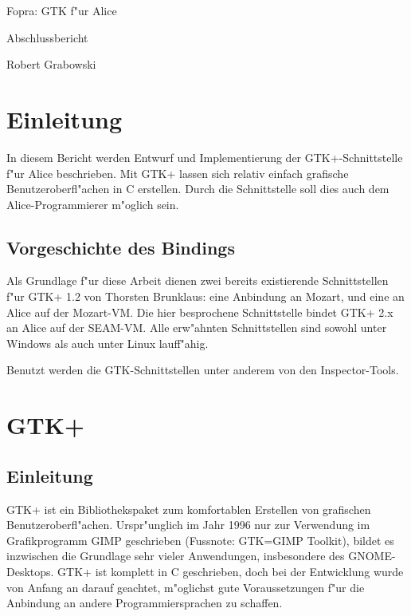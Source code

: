 \documentclass{article}
\begin{document}
\begin{center}
\begin{huge}Fopra: GTK f"ur Alice\end{huge}

Abschlussbericht

Robert Grabowski

\end{center}

\section{Einleitung}

In diesem Bericht werden Entwurf und Implementierung der 
GTK+-Schnittstelle f"ur Alice beschrieben. Mit GTK+ lassen sich relativ einfach
grafische Benutzeroberfl"achen in C erstellen. Durch die Schnittstelle soll
dies auch dem Alice-Programmierer m"oglich sein.

\subsection{Vorgeschichte des Bindings}

Als Grundlage f"ur diese Arbeit dienen zwei bereits existierende
Schnittstellen f"ur GTK+ 1.2 von Thorsten Brunklaus:
eine Anbindung an Mozart, und eine an Alice auf der Mozart-VM.
Die hier besprochene Schnittstelle bindet GTK+ 2.x an Alice auf der SEAM-VM.
Alle erw"ahnten Schnittstellen sind sowohl unter Windows als auch unter
Linux lauff"ahig.

Benutzt werden die GTK-Schnittstellen unter anderem von den Inspector-Tools.

\section{GTK+}

\subsection{Einleitung}

GTK+ ist ein Bibliothekspaket zum komfortablen Erstellen von grafischen
Benutzeroberfl"achen. Urspr"unglich im Jahr 1996 nur zur Verwendung im
Grafikprogramm GIMP geschrieben (Fussnote: GTK=GIMP Toolkit), bildet es
inzwischen die Grundlage sehr vieler Anwendungen, insbesondere des 
GNOME-Desktops. GTK+ ist komplett
in C geschrieben, doch bei der Entwicklung wurde von Anfang an darauf geachtet,
m"oglichst gute Voraussetzungen f"ur die Anbindung an andere
Programmiersprachen zu schaffen.
\end{document}
